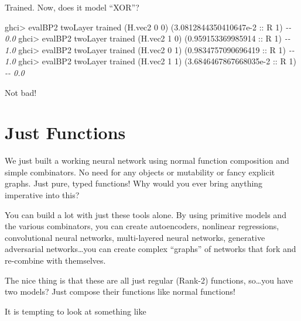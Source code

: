 \documentclass[]{article}
\newenvironment{Shaded}{}{}
\newcommand{\CommentTok}[1]{\textcolor[rgb]{0.38,0.63,0.69}{\textit{#1}}}
\newcommand{\DataTypeTok}[1]{\textcolor[rgb]{0.56,0.13,0.00}{#1}}
\newcommand{\DecValTok}[1]{\textcolor[rgb]{0.25,0.63,0.44}{#1}}
\newcommand{\FloatTok}[1]{\textcolor[rgb]{0.25,0.63,0.44}{#1}}
\newcommand{\NormalTok}[1]{#1}
\newcommand{\OperatorTok}[1]{\textcolor[rgb]{0.40,0.40,0.40}{#1}}
\newcommand{\OtherTok}[1]{\textcolor[rgb]{0.00,0.44,0.13}{#1}}
\begin{document}
Trained. Now, does it model ``XOR''?

\begin{Shaded}
\begin{Highlighting}[]
\NormalTok{ghci}\OperatorTok{\textgreater{}}\NormalTok{ evalBP2 twoLayer trained (H.vec2 }\DecValTok{0} \DecValTok{0}\NormalTok{)}
\NormalTok{(}\FloatTok{3.0812844350410647e{-}2}\OtherTok{ ::} \DataTypeTok{R} \DecValTok{1}\NormalTok{)          }\CommentTok{{-}{-} 0.0}
\NormalTok{ghci}\OperatorTok{\textgreater{}}\NormalTok{ evalBP2 twoLayer trained (H.vec2 }\DecValTok{1} \DecValTok{0}\NormalTok{)}
\NormalTok{(}\FloatTok{0.959153369985914}\OtherTok{ ::} \DataTypeTok{R} \DecValTok{1}\NormalTok{)              }\CommentTok{{-}{-} 1.0}
\NormalTok{ghci}\OperatorTok{\textgreater{}}\NormalTok{ evalBP2 twoLayer trained (H.vec2 }\DecValTok{0} \DecValTok{1}\NormalTok{)}
\NormalTok{(}\FloatTok{0.9834757090696419}\OtherTok{ ::} \DataTypeTok{R} \DecValTok{1}\NormalTok{)             }\CommentTok{{-}{-} 1.0}
\NormalTok{ghci}\OperatorTok{\textgreater{}}\NormalTok{ evalBP2 twoLayer trained (H.vec2 }\DecValTok{1} \DecValTok{1}\NormalTok{)}
\NormalTok{(}\FloatTok{3.6846467867668035e{-}2}\OtherTok{ ::} \DataTypeTok{R} \DecValTok{1}\NormalTok{)          }\CommentTok{{-}{-} 0.0}
\end{Highlighting}
\end{Shaded}

Not bad!

\section{Just Functions}\label{just-functions}

We just built a working neural network using normal function composition and
simple combinators. No need for any objects or mutability or fancy explicit
graphs. Just pure, typed functions! Why would you ever bring anything imperative
into this?

You can build a lot with just these tools alone. By using primitive models and
the various combinators, you can create autoencoders, nonlinear regressions,
convolutional neural networks, multi-layered neural networks, generative
adversarial networks\ldots you can create complex ``graphs'' of networks that
fork and re-combine with themselves.

The nice thing is that these are all just regular (Rank-2) functions,
so\ldots you have two models? Just compose their functions like normal
functions!

It is tempting to look at something like
\end{document}
